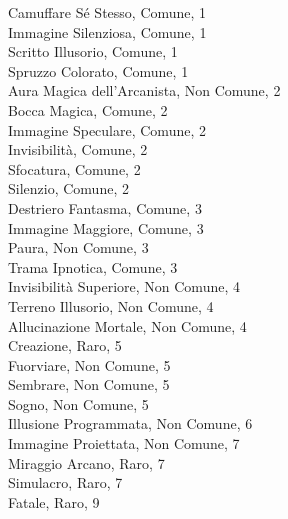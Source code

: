 \begin{multicols}{3}
Camuffare Sé Stesso, Comune, 1\\
Immagine Silenziosa, Comune, 1\\
Scritto Illusorio, Comune, 1\\
Spruzzo Colorato, Comune, 1\\
Aura Magica dell'Arcanista, Non Comune, 2\\
Bocca Magica, Comune, 2\\
Immagine Speculare, Comune, 2\\
Invisibilità, Comune, 2\\
Sfocatura, Comune, 2\\
Silenzio, Comune, 2\\
Destriero Fantasma, Comune, 3\\
Immagine Maggiore, Comune, 3\\
Paura, Non Comune, 3\\
Trama Ipnotica, Comune, 3\\
Invisibilità Superiore, Non Comune, 4\\
Terreno Illusorio, Non Comune, 4\\
Allucinazione Mortale, Non Comune, 4\\
Creazione, Raro, 5\\
Fuorviare, Non Comune, 5\\
Sembrare, Non Comune, 5\\
Sogno, Non Comune, 5\\
Illusione Programmata, Non Comune, 6\\
Immagine Proiettata, Non Comune, 7\\
Miraggio Arcano, Raro, 7\\
Simulacro, Raro, 7\\
Fatale, Raro, 9\\



\end{multicols}
